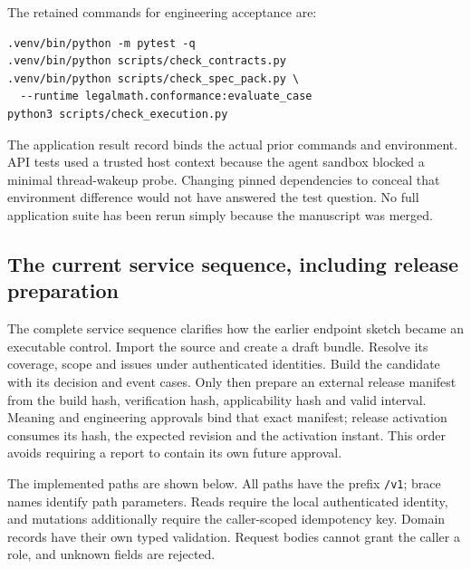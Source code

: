 The retained commands for engineering acceptance are:
\begin{lstlisting}
.venv/bin/python -m pytest -q
.venv/bin/python scripts/check_contracts.py
.venv/bin/python scripts/check_spec_pack.py \
  --runtime legalmath.conformance:evaluate_case
python3 scripts/check_execution.py
\end{lstlisting}
The application result record binds the actual prior commands and environment.
API tests used a trusted host context because the agent sandbox blocked a
minimal thread-wakeup probe. Changing pinned dependencies to conceal that
environment difference would not have answered the test question. No full
application suite has been rerun simply because the manuscript was merged.

\subsection{The current service sequence, including release preparation}

The complete service sequence clarifies how the earlier endpoint sketch became
an executable control. Import the source and create a draft bundle. Resolve
its coverage, scope and issues under authenticated identities. Build the
candidate with its decision and event cases. Only then prepare an external
release manifest from the build hash, verification hash, applicability hash
and valid interval. Meaning and engineering approvals bind that exact manifest;
release activation consumes its hash, the expected revision and the activation
instant. This order avoids requiring a report to contain its own future approval.

The implemented paths are shown below. All paths have the prefix
\texttt{/v1}; brace names identify path parameters. Reads require the local
authenticated identity, and mutations additionally require the caller-scoped
idempotency key. Domain records have their own typed validation. Request bodies
cannot grant the caller a role, and unknown fields are rejected.

